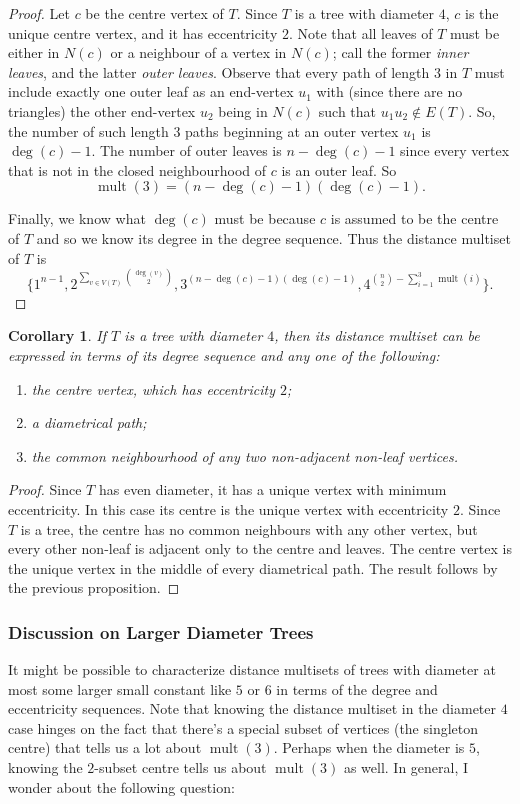 \documentclass[12]{article}
\DeclareMathOperator{\mult}{mult}
\newtheorem{cor}[thm]{Corollary}
\theoremstyle{definition}
\begin{document}
	\begin{proof}
		Let $c$ be the centre vertex of $T$.  Since $T$ is a tree with diameter $4$, $c$ is the unique centre vertex, and it has eccentricity $2$.  Note that all leaves of $T$ must be either in $N(c)$ or a neighbour of a vertex in $N(c)$; call the former \textit{inner leaves}, and the latter \textit{outer leaves}.  Observe that every path of length $3$ in $T$ must include exactly one outer leaf as an end-vertex $u_1$ with (since there are no triangles) the other end-vertex $u_2$ being in $N(c)$ such that $u_1u_2 \notin E(T)$.  So, the number of such length $3$ paths beginning at an outer vertex $u_1$ is $\deg(c)-1$.  The number of outer leaves is $n-\deg(c)-1$ since every vertex that is not in the closed neighbourhood of $c$ is an outer leaf.  So
		$$ \mult(3) = (n-\deg(c)-1)(\deg(c)-1).$$
		
		Finally, we know what $\deg(c)$ must be because $c$ is assumed to be the centre of $T$ and so we know its degree in the degree sequence. Thus the distance multiset of $T$ is
		$$\{1^{n-1}, 2^{\sum_{v \in V(T)}{\deg(v) \choose 2}}, 3^{(n-\deg(c)-1)(\deg(c)-1)}, 4^{{n \choose 2} - \sum_{i=1}^3 \mult(i)} \}.$$\qedhere
	\end{proof}

	\begin{cor}
		If $T$ is a tree with diameter $4$, then its distance multiset can be expressed in terms of its degree sequence and any one of the following:
		\begin{enumerate}
			\item the centre vertex, which has eccentricity $2$;
			\item a diametrical path;
			\item the common neighbourhood of any two non-adjacent non-leaf vertices.
		\end{enumerate}
	\end{cor}
	\begin{proof}
		Since $T$ has even diameter, it has a unique vertex with minimum eccentricity.  In this case its centre is the unique vertex with eccentricity $2$.  Since $T$ is a tree, the centre has no common neighbours with any other vertex, but every other non-leaf is adjacent only to the centre and leaves.  The centre vertex is the unique vertex in the middle of every diametrical path.  The result follows by the previous proposition. \qedhere
	\end{proof}

	\subsubsection{Discussion on Larger Diameter Trees} It might be possible to characterize distance multisets of trees with diameter at most some larger small constant like $5$ or $6$ in terms of the degree and eccentricity sequences.  Note that knowing the distance multiset in the diameter $4$ case hinges on the fact that there's a special subset of vertices (the singleton centre) that tells us a lot about $\mult(3)$.  Perhaps when the diameter is $5$, knowing the $2$-subset centre tells us about $\mult(3)$ as well.  In general, I wonder about the following question:
	
\end{document}
